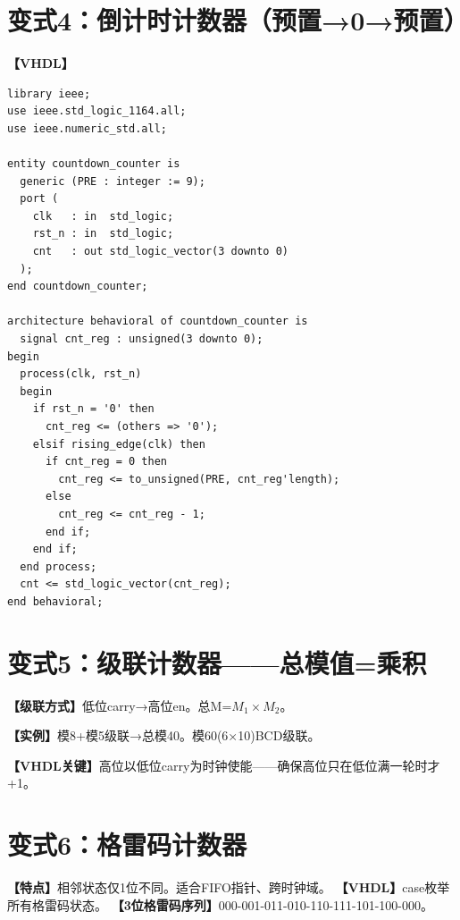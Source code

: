 \section{变式4：倒计时计数器（预置→0→预置）}

\begin{detailbox}[完整教学]
\textbf{【VHDL】}
\begin{lstlisting}
library ieee;
use ieee.std_logic_1164.all;
use ieee.numeric_std.all;

entity countdown_counter is
  generic (PRE : integer := 9);
  port (
    clk   : in  std_logic;
    rst_n : in  std_logic;
    cnt   : out std_logic_vector(3 downto 0)
  );
end countdown_counter;

architecture behavioral of countdown_counter is
  signal cnt_reg : unsigned(3 downto 0);
begin
  process(clk, rst_n)
  begin
    if rst_n = '0' then
      cnt_reg <= (others => '0');
    elsif rising_edge(clk) then
      if cnt_reg = 0 then
        cnt_reg <= to_unsigned(PRE, cnt_reg'length);
      else
        cnt_reg <= cnt_reg - 1;
      end if;
    end if;
  end process;
  cnt <= std_logic_vector(cnt_reg);
end behavioral;
\end{lstlisting}
\end{detailbox}


\section{变式5：级联计数器——总模值=乘积}

\begin{detailbox}[完整教学]
\textbf{【级联方式】}低位carry→高位en。总M=$M_1 \times M_2$。

\textbf{【实例】}模8+模5级联→总模40。模60(6×10)BCD级联。

\textbf{【VHDL关键】}高位以低位carry为时钟使能——确保高位只在低位满一轮时才+1。
\end{detailbox}


\section{变式6：格雷码计数器}

\begin{detailbox}[完整教学]
\textbf{【特点】}相邻状态仅1位不同。适合FIFO指针、跨时钟域。
\textbf{【VHDL】}case枚举所有格雷码状态。
\textbf{【3位格雷码序列】}000-001-011-010-110-111-101-100-000。
\end{detailbox}
